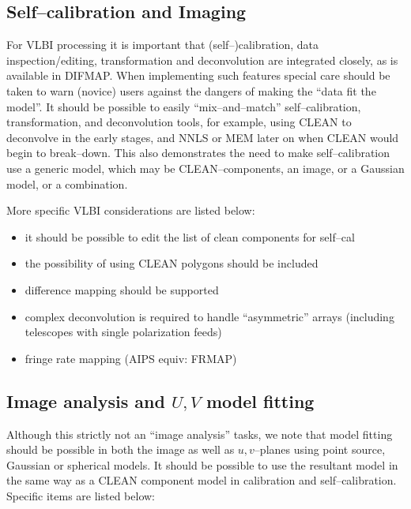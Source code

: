 \subsection{Self--calibration and Imaging}

For VLBI processing it is important that (self--)calibration, data
inspection\slash editing, transformation and deconvolution are
integrated closely, as is available in DIFMAP.  When implementing such
features special care should be taken to warn (novice) users against
the dangers of making the ``data fit the model''.  It should be
possible to easily ``mix--and--match'' self--calibration,
transformation, and deconvolution tools, for example, using CLEAN to
deconvolve in the early stages, and NNLS or MEM later on when
CLEAN would begin to break--down. This also demonstrates the need to
make self--calibration use a generic model, which may be
CLEAN--components, an image, or a Gaussian model, or a combination.

More specific VLBI considerations are listed below:

\begin{itemize}

\item it should be possible to edit the list of clean components for self--cal

\item the possibility of using CLEAN polygons should be included

\item difference mapping should be supported
  
\item complex deconvolution is required to handle ``asymmetric''
  arrays (including telescopes with single polarization feeds)
  
\item fringe rate mapping (AIPS equiv: FRMAP)

\end{itemize}

\subsection{Image analysis and $U,\! V$ model fitting}

Although this strictly not an ``image analysis'' tasks, we note that
model fitting should be possible in both the image as well as
$u,\! v$--planes using point source, Gaussian or spherical models.  It
should be possible to use the resultant model in the same way as a
CLEAN component model in calibration and self--calibration. Specific
items are listed below:

